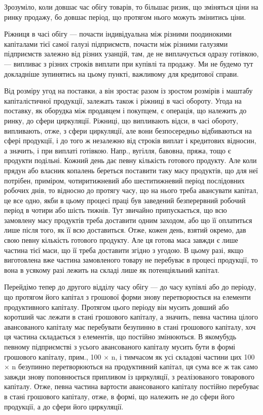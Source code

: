 Зрозуміло, коли довшає час обігу товарів, то більшає ризик, що
зміняться ціни на ринку продажу, бо довшає період, що протягом нього
можуть змінитись ціни.

Ріжниця в часі обігу — почасти індивідуальна між різними поодинокими
капіталами тієї самої галузі підприємств, почасти між різними галузями
підприємств залежно від різних узанцій, там, де не виплачується
одразу готівкою, — випливає з різних строків виплати при купівлі та
продажу. Ми не будемо тут докладніше зупинятись на цьому пункті,
важливому для кредитової справи.

Від розміру угод на поставки, а він зростає разом із зростом розмірів
і маштабу капіталістичної продукції, залежать також і ріжниці в часі
обороту. Угода на поставку, як оборудка між продавцем і покупцем, є
операція, що належить до ринку, до сфери циркуляції. Ріжниці, що випливають
відси, в часі обороту, випливають, отже, з сфери циркуляції,
але вони безпосередньо відбиваються на сфері продукції, і до того ж
незалежно від строків виплат і кредитових відносин, а значить, і при виплаті
готівкою. Напр., вугілля, бавовна, пряжа, тощо є продукти подільні.
Кожний день дає певну кількість готового продукту. Але коли прядун
або власник копалень береться поставити таку масу продуктів, що для
неї потрібен, приміром, чотиритижневий або шеститижневий період послідовних
робочих днів, то відносно до протягу часу, що на нього треба
авансувати капітал, це все одно, якби в цьому процесі праці був заведений
безперервний робочий період в чотири або шість тижнів. Тут звичайно
припускається, що всю замовлену масу продуктів треба доставити
одним заходом, або що її оплатиться лише після того, як її всю доставиться.
Отже, кожен день, взятий окремо, дав свою певну кількість готового
продукту. Але ця готова маса завжди є лише частина тієї маси,
що її треба доставити згідно з угодою. В цьому разі, якщо виготовлена
вже частина замовленого товару не перебуває в процесі продукції, то
вона в усякому разі лежить на складі лише як потенціяльний капітал.

Перейдімо тепер до другого відділу часу обігу — до часу купівлі або
до періоду, що протягом його капітал з грошової форми знову перетворюється
на елементи продуктивного капіталу. Протягом цього періоду
він мусить довший або коротший час лежати в стані грошового капіталу,
а значить, певна частина цілого авансованого капіталу має перебувати
безупинно в стані грошового капіталу, хоч ця частина складається з елементів,
що постійно змінюються. В якомубудь певному підприємстві з
усього авансованого капіталу мусить бути в формі грошового капіталу,
прим., 100 × n, і тимчасом як усі складові частини цих 100 × n безупинно перетворюються на продуктивний капітал, ця сума
все ж так само завжди знову поповнюється припливом із циркуляції, з реалізованого
товарового капіталу. Отже, певна частина вартости авансованого
капіталу постійно перебуває в стані грошового капіталу, отже, в формі,
що належить не до сфери його продукції, а до сфери його циркуляції.

